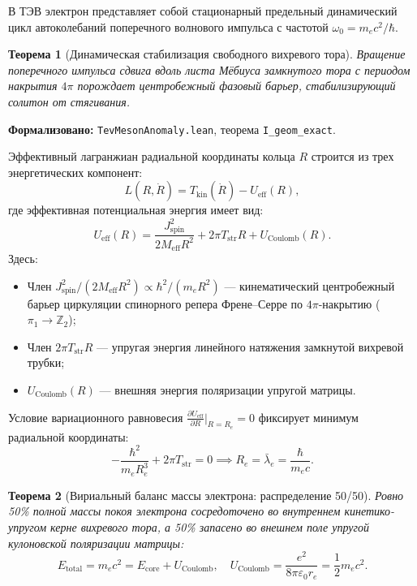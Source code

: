 \documentclass[11pt,a4paper]{article}
\providecommand{\lambdabar}{\bar{\lambda}}
\newtheorem{theorem}{Теорема}
\theoremstyle{definition}
\theoremstyle{remark}
\begin{document}
В ТЭВ электрон представляет собой стационарный предельный динамический цикл автоколебаний поперечного волнового импульса с частотой $\omega_0 = m_e c^2 / \hbar$.
	
\begin{theorem}[Динамическая стабилизация свободного вихревого тора]
\label{thm:electron_dynamic_stabilization}
Вращение поперечного импульса сдвига вдоль листа Мёбиуса замкнутого тора с периодом накрытия $4\pi$ порождает центробежный фазовый барьер, стабилизирующий солитон от стягивания.
\end{theorem}

\noindent\small\textbf{Формализовано:} \texttt{TevMesonAnomaly.lean}, теорема \texttt{I_geom_exact}.

Эффективный лагранжиан радиальной координаты кольца $R$ строится из трех энергетических компонент:
\begin{equation}
	L(R, \dot{R}) = T_{\mathrm{kin}}(\dot{R}) - U_{\mathrm{eff}}(R),
	\label{eq:electron_lagrangian}
\end{equation}
где эффективная потенциальная энергия имеет вид:
\begin{equation}
U_{\mathrm{eff}}(R) = \frac{J_{\mathrm{spin}}^2}{2 M_{\mathrm{eff}} R^2} + 2\pi T_{\mathrm{str}} R + U_{\mathrm{Coulomb}}(R).
\label{eq:electron_effective_potential}
\end{equation}
Здесь:
\begin{itemize}
\item Член $J_{\mathrm{spin}}^2 / (2 M_{\mathrm{eff}} R^2) \propto \hbar^2 / (m_e R^2)$ — кинематический центробежный барьер циркуляции спинорного репера Френе--Серре по $4\pi$-накрытию ($\pi_1 \to \mathbb{Z}_2$);
\item Член $2\pi T_{\mathrm{str}} R$ — упругая энергия линейного натяжения замкнутой вихревой трубки;
\item $U_{\mathrm{Coulomb}}(R)$ — внешняя энергия поляризации упругой матрицы.
\end{itemize}
	
Условие вариационного равновесия $\frac{\partial U_{\mathrm{eff}}}{\partial R}\Big|_{R = R_e} = 0$ фиксирует минимум радиальной координаты:
\begin{equation}
-\frac{\hbar^2}{m_e R_e^3} + 2\pi T_{\mathrm{str}} = 0 \implies R_e = \lambdabar_e = \frac{\hbar}{m_e c}.
\label{eq:electron_radius_equilibrium}
\end{equation}
	
\begin{theorem}[Вириальный баланс массы электрона: распределение 50/50]
\label{thm:electron_virial_balance}
Ровно 50\% полной массы покоя электрона сосредоточено во внутреннем кинетико-упругом керне вихревого тора, а 50\% запасено во внешнем поле упругой кулоновской поляризации матрицы:
\begin{equation}
	E_{\mathrm{total}} = m_e c^2 = E_{\mathrm{core}} + U_{\mathrm{Coulomb}}, \quad U_{\mathrm{Coulomb}} = \frac{e^2}{8\pi\varepsilon_0 r_e} = \frac{1}{2} m_e c^2.
	\label{eq:electron_virial_balance}
\end{equation}
\end{theorem}
\end{document}
